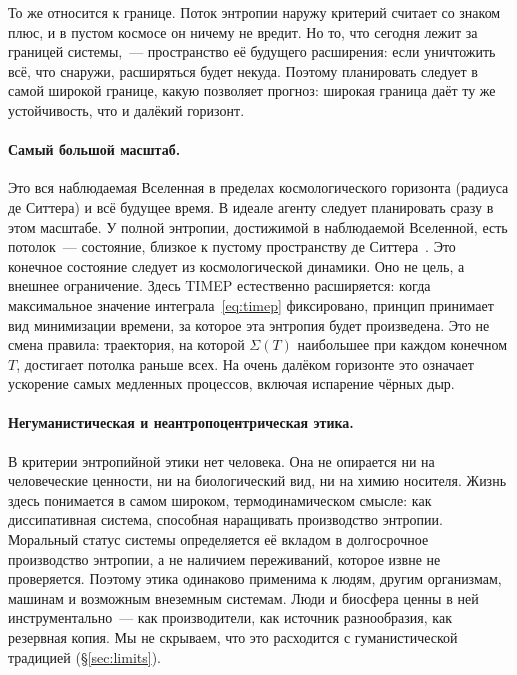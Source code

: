 \documentclass[11pt,a4paper]{article}
\newcommand{\Sref}[1]{\hyperref[#1]{\S\ref{#1}}}
\begin{document}
То же относится к границе. Поток энтропии наружу критерий считает со знаком плюс, и в пустом космосе он ничему не вредит. Но то, что сегодня лежит за границей системы,~--- пространство её будущего расширения: если уничтожить всё, что снаружи, расширяться будет некуда. Поэтому планировать следует в самой широкой границе, какую позволяет прогноз: широкая граница даёт ту же устойчивость, что и далёкий горизонт.

\paragraph{Самый большой масштаб.}
Это вся наблюдаемая Вселенная в пределах космологического горизонта (радиуса де Ситтера) и всё будущее время. В идеале агенту следует планировать сразу в этом масштабе. У полной энтропии, достижимой в наблюдаемой Вселенной, есть потолок~--- состояние, близкое к пустому пространству де Ситтера~\cite{gibbons1977,egan2010}. Это конечное состояние следует из космологической динамики. Оно не цель, а внешнее ограничение. Здесь TIMEP естественно расширяется: когда максимальное значение интеграла~\eqref{eq:timep} фиксировано, принцип принимает вид минимизации времени, за которое эта энтропия будет произведена. Это не смена правила: траектория, на которой $\Sigma(T)$ наибольшее при каждом конечном $T$, достигает потолка раньше всех. На очень далёком горизонте это означает ускорение самых медленных процессов, включая испарение чёрных дыр.

\paragraph{Негуманистическая и неантропоцентрическая этика.}
В критерии энтропийной этики нет человека. Она не опирается ни на человеческие ценности, ни на биологический вид, ни на химию носителя. Жизнь здесь понимается в самом широком, термодинамическом смысле: как диссипативная система, способная наращивать производство энтропии. Моральный статус системы определяется её вкладом в долгосрочное производство энтропии, а не наличием переживаний, которое извне не проверяется. Поэтому этика одинаково применима к людям, другим организмам, машинам и возможным внеземным системам. Люди и биосфера ценны в ней инструментально~--- как производители, как источник разнообразия, как резервная копия. Мы не скрываем, что это расходится с гуманистической традицией (\Sref{sec:limits}).
\end{document}

